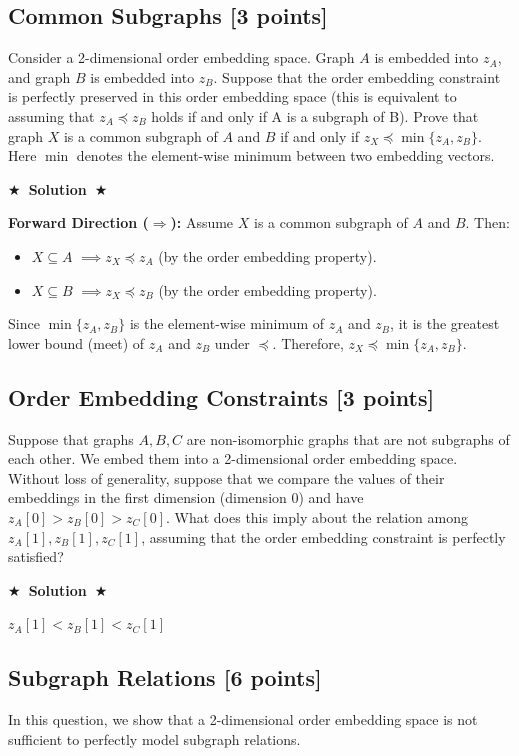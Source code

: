 \documentclass[11pt]{article}
\numberwithin{figure}{section}
\newcommand{\Solution}[1]{{\medskip \color{red} \bf $\bigstar$~\sf \textbf{Solution}~$\bigstar$ \sf #1 } \bigskip}
\begin{document}
\subsection{Common Subgraphs [3 points]}
Consider a 2-dimensional order embedding space. Graph $A$ is embedded into $z_A$, and graph $B$ is embedded into $z_B$. Suppose that the order embedding constraint is perfectly preserved in this order embedding space (this is equivalent to assuming that $z_A \preccurlyeq z_B$ holds if and only if A is a subgraph of B). Prove that graph $X$ is a common subgraph of $A$ and $B$ if and only if $z_X \preccurlyeq \min\{z_A, z_B\}$. Here $\min$ denotes the element-wise minimum between two embedding vectors.

\Solution{}

\textbf{Forward Direction ($ \Rightarrow $):}  
Assume $ X $ is a common subgraph of $ A $ and $ B $. Then:  
\begin{itemize}
    \item $ X \subseteq A $ $\implies z_X \preccurlyeq z_A $ (by the order embedding property).
    \item $ X \subseteq B $ $\implies z_X \preccurlyeq z_B $ (by the order embedding property).
\end{itemize}
Since $ \min\{z_A, z_B\} $ is the element-wise minimum of $ z_A $ and $ z_B $, it is the greatest lower bound (meet) of $ z_A $ and $ z_B $ under $ \preccurlyeq $.  
Therefore, $ z_X \preccurlyeq \min\{z_A, z_B\} $.

\subsection{Order Embedding Constraints [3 points]}
Suppose that graphs $A,B,C$ are non-isomorphic graphs that are not subgraphs of each other. We embed them into a 2-dimensional order embedding space. Without loss of generality, suppose that we compare the values of their embeddings in the first dimension (dimension 0) and have $z_A[0] > z_B[0] > z_C[0]$. What does this imply about the relation among $z_A[1],z_B[1],z_C[1]$, assuming that the order embedding constraint is perfectly satisfied?

\Solution{}

$z_A[1] < z_B[1] < z_C[1]$

\subsection{Subgraph Relations [6 points]}
In this question, we show that a 2-dimensional order embedding space is not sufficient to perfectly model subgraph relations.
\end{document}
